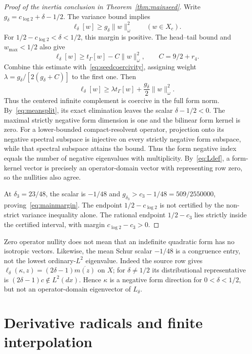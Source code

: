 \documentclass[11pt,a4paper]{article}
\numberwithin{equation}{section}
\theoremstyle{remark}
\newcommand{\tg}{t_{\Gamma}}
\newcommand{\norm}[1]{\lVert #1\rVert}
\begin{document}
\begin{proof}[Proof of the inertia conclusion in Theorem~\ref{thm:mainseed}]
Write $g_\delta=c_{\log2}+\delta-1/2$. The variance bound implies
\begin{equation}\label{eq:seedcoercivity}
 \ell_\delta[w]\ge g_\delta\norm w_\omega^2\qquad(w\in X_c).
\end{equation}
For $1/2-c_{\log2}<\delta<1/2$, this margin is positive. The head--tail bound and $w_{\max}<1/2$ also give
\[
 \ell_\delta[w]\ge\tg[w]-C\norm w_\omega^2,
 \qquad C=9/2+r_4.
\]
Combine this estimate with~\eqref{eq:seedcoercivity}, assigning weight
$\lambda=g_\delta/[2(g_\delta+C)]$ to the first one. Then
\begin{equation}\label{eq:fullseedcoercivity}
 \ell_\delta[w]\ge\lambda\tg[w]
                         +\frac{g_\delta}{2}\norm w_\omega^2.
\end{equation}
Thus the centered infinite complement is coercive in the full form norm. By~\eqref{eq:meansplit}, its exact elimination leaves the scalar $\delta-1/2<0$. The maximal strictly negative form dimension is one and the bilinear form kernel is zero. For a lower-bounded compact-resolvent operator, projection onto its negative spectral subspace is injective on every strictly negative form subspace, while that spectral subspace attains the bound. Thus the form negative index equals the number of negative eigenvalues with multiplicity. By~\eqref{eq:Ldef}, a form-kernel vector is precisely an operator-domain vector with representing row zero, so the nullities also agree.

At $\delta_3=23/48$, the scalar is $-1/48$ and
$g_{\delta_3}>c_3-1/48=509/2550000$, proving~\eqref{eq:mainmargin}.
The endpoint $1/2-c_{\log2}$ is not certified by the non-strict variance inequality alone. The rational endpoint $1/2-c_3$ lies strictly inside the certified interval, with margin $c_{\log2}-c_3>0$.
\end{proof}

Zero operator nullity does not mean that an indefinite quadratic form has no isotropic vectors. Likewise, the mean Schur scalar $-1/48$ is a congruence entry, not the lowest ordinary-$L^2$ eigenvalue. Indeed the source row gives
$\ell_\delta(\kappa,z)=(2\delta-1)\overline{m(z)}$ on $X$; for $\delta\ne1/2$ its distributional representative is $(2\delta-1)c\notin L^2(dx)$. Hence $\kappa$ is a negative form direction for $0<\delta<1/2$, but not an operator-domain eigenvector of $L_\delta$.

\section{Derivative radicals and finite interpolation}\label{sec:radical}
\end{document}
